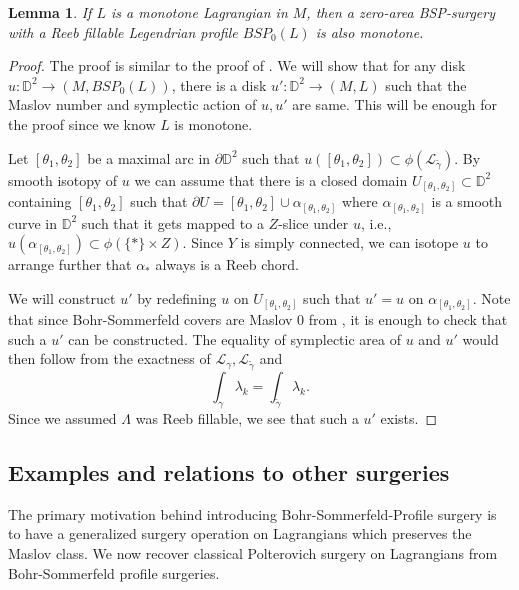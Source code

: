 \documentclass[11pt, oneside,dvipsnames]{amsart}
\renewcommand{\to}{\rightarrow}
\newcommand{\sub}{\subset}
\newcommand{\wt}{\widetilde}
\renewcommand{\to}{\rightarrow}
\newcommand{\<}{\langle}
\renewcommand{\>}{\rangle}
\newcommand{\bD}{\mathbb{D}}
\newcommand{\cL}{\mathcal{L}}
\renewcommand{\to}{\rightarrow}
\newtheorem{lemma}[Theorem]{Lemma}
\theoremstyle{definition}
\theoremstyle{definition}
\numberwithin{equation}{subsection}
\begin{document}
\begin{lemma}\label{ref:mono}
    If $L$ is a monotone Lagrangian in $M$, then a zero-area BSP-surgery with a Reeb fillable Legendrian profile  $BSP_0(L)$ is also monotone.
\end{lemma}
\begin{proof}
    The proof is similar to the proof of \cite[Lemma~2.21]{Cha23}.  We will show that for any disk $u:\bD^2 \to (M,BSP_0(L))$, there is a disk $u':\bD^2 \to (M,L)$ such that the Maslov number and symplectic action of $u,u'$ are same. This will be enough for the proof since we know $L$ is monotone.
    
    Let $[\theta_1,\theta_2]$ be a maximal arc in $\partial \bD^2$ such that $u([\theta_1,\theta_2]) \sub \phi(\cL_{\wt \gamma}).$ By smooth isotopy of $u$ we can assume that there is a closed domain $U_{[\theta_1,\theta_2]} \subset \bD^2 $ containing $[\theta_1,\theta_2]$ such that $\partial U = [\theta_1,\theta_2] \cup \alpha_{[\theta_1,\theta_2]}$  where $\alpha_{[\theta_1,\theta_2]}$ is a smooth curve in $\bD^2$ such that it gets mapped to a $Z$-slice under $u$, i.e., $u(\alpha_{[\theta_1,\theta_2]}) \subset \phi(\{ * \} \times Z)$. Since $Y$ is simply connected, we can isotope $u$ to arrange further that $\alpha_*$ always is a Reeb chord.
    
    We will construct $u'$ by redefining $u$ on $U_{[\theta_1,\theta_2]}$ such that $u'= u$ on $\alpha_{[\theta_1,\theta_2]}$. Note that since Bohr-Sommerfeld covers are Maslov 0 from \cite[\S~4.2]{rg19}, it is enough to check that such a $u'$ can be constructed. The equality of symplectic area of $u$ and $u'$ would then follow from  the exactness of $\cL_{\gamma}, \cL_{\wt\gamma}$ and 
     \begin{equation*}        \int_\gamma \lambda_k = \int_{\wt \gamma} \lambda_k.
    \end{equation*}
   Since we assumed $\Lambda $ was Reeb fillable, we see that such a $u'$ exists.
    
\end{proof}
\subsection{Examples and relations to other surgeries}

The primary motivation behind introducing Bohr-Sommerfeld-Profile surgery is to have a generalized surgery operation on Lagrangians which preserves the Maslov class. We now recover classical Polterovich surgery on Lagrangians from Bohr-Sommerfeld profile surgeries.
\end{document}
